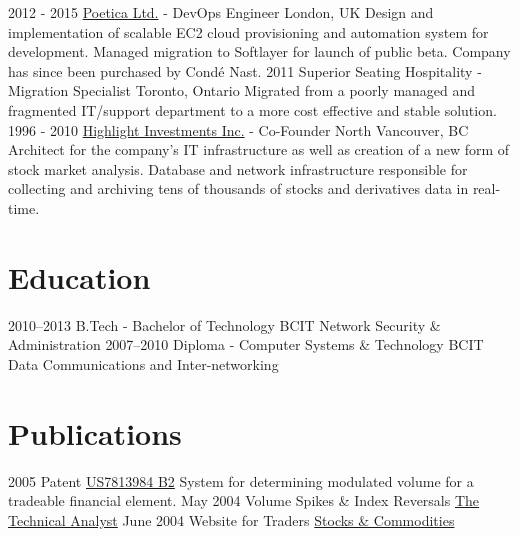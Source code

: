 \documentclass[]{friggeri-cv}
\begin{document}
\begin{entrylist}
  \entry
    {2012 - 2015}
    {\href{https://www.linkedin.com/company-beta/3491430}{Poetica Ltd.} - DevOps Engineer}
    {London, UK}
    {Design and implementation of scalable EC2 cloud provisioning and automation system for development. Managed migration to Softlayer for launch of public beta. Company has since been purchased by Condé Nast.}
  \entry
    {2011}
    {Superior Seating Hospitality - Migration Specialist}
    {Toronto, Ontario}
    {Migrated from a poorly managed and fragmented IT/support department to a more cost effective and stable solution.}
  \entry
    {1996 - 2010}
    {\href{https://www.marketvolume.com}{Highlight Investments Inc.} - Co-Founder}
    {North Vancouver, BC}
    {Architect for the company's IT infrastructure as well as creation of a new form of stock market analysis. Database and network infrastructure responsible for collecting and archiving tens of thousands of stocks and derivatives data in real-time.}
\end{entrylist}

\section{Education}

\begin{entrylist}
  \entry
    {2010–2013}
    {B.Tech - Bachelor of Technology}
    {BCIT}
    {Network Security \& Administration}
  \entry
    {2007–2010}
    {Diploma - Computer Systems \& Technology}
    {BCIT}
    {Data Communications and Inter-networking}
\end{entrylist}

\section{Publications}

\begin{entrylist}
  \entry
    {2005}
    {Patent}
    {\href{https://www.google.com/patents/US7813984?dq=7813984&ei=Ce52UvW8PIKsjAKgioDoBw}{US7813984 B2}}
    {System for determining modulated volume for a tradeable financial element.}
  \entry
    {May 2004}
    {Volume Spikes \& Index Reversals}
    {\href{https://www.scribd.com/document/181246479/Volume-Spikes-Index-Reversals-The-Technical-Analyst-May-2004}{The Technical Analyst}}
    {}
  \entry
    {June 2004}
    {Website for Traders}
    {\href{https://www.scribd.com/doc/181244683/Website-for-Traders-Stocks-Commodities-June-2004}{Stocks \& Commodities}}
    {}
\end{entrylist}
\end{document}
